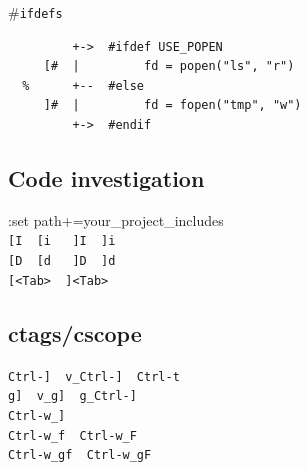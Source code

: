 \documentclass[14pt,svgnames,compress]{beamer}
\newcommand\hl[1]{\textcolor{HlColor}{#1}}
\newcommand\framesubtitlefontsize{\huge}
\newcommand\singleframesubtitle[1]{
    \begin{center}
        \framesubtitlefontsize #1
    \end{center}
}
\newcommand\subtitleframe{
    \begin{frame}
        \singleframesubtitle{\insertsubsectionhead}
    \end{frame}
}
\begin{document}
\begin{frame}[fragile]
    \singleframesubtitle{\hl{\#}\Verb|ifdefs|}
\end{frame}

\begin{frame}[fragile]
    \small
     \begin{Verbatim}
         +->  #ifdef USE_POPEN
     [#  |         fd = popen("ls", "r")
  %      +--  #else
     ]#  |         fd = fopen("tmp", "w")
         +->  #endif
    \end{Verbatim}
\end{frame}


\subsection{Code investigation}

\subtitleframe

\begin{frame}[fragile]
    \begin{spacing}{1.5} %
        \centering
        \large
        :set \hl{path}+=your\_project\_includes \\
        \vspace{1cm}
        \Large
        \verb|[I  [i   ]I  ]i| \\
        \verb|[D  [d   ]D  ]d| \\
        \verb|[<Tab>  ]<Tab>| \\
    \end{spacing}
\end{frame}


\subsection{ctags/cscope}

\subtitleframe

\begin{frame}[fragile]
    \begin{spacing}{1.5} %
        \Large
        \centering
        \verb|Ctrl-]  v_Ctrl-]  Ctrl-t| \\
        \verb|g]  v_g]  g_Ctrl-]| \\
        \verb|Ctrl-w_]| \\
        \verb|Ctrl-w_f  Ctrl-w_F| \\
        \verb|Ctrl-w_gf  Ctrl-w_gF|
    \end{spacing}
\end{frame}
\end{document}
